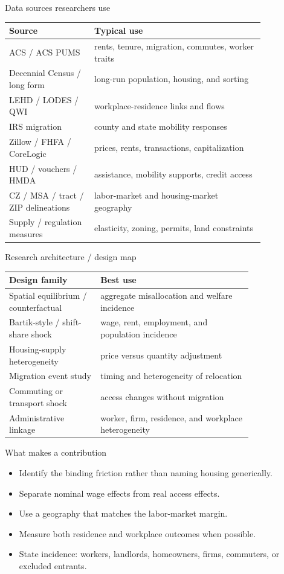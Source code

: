 \documentclass[aspectratio=169,11pt]{beamer}
\begin{document}
\begin{frame}{Data sources researchers use}
\small
\begin{tabular}{p{0.28\linewidth} p{0.56\linewidth}}
\toprule
Source & Typical use \\
\midrule
ACS / ACS PUMS & rents, tenure, migration, commutes, worker traits \\
Decennial Census / long form & long-run population, housing, and sorting \\
LEHD / LODES / QWI & workplace-residence links and flows \\
IRS migration & county and state mobility responses \\
Zillow / FHFA / CoreLogic & prices, rents, transactions, capitalization \\
HUD / vouchers / HMDA & assistance, mobility supports, credit access \\
CZ / MSA / tract / ZIP delineations & labor-market and housing-market geography \\
Supply / regulation measures & elasticity, zoning, permits, land constraints \\
\bottomrule
\end{tabular}
\end{frame}

\begin{frame}{Research architecture / design map}
\small
\begin{tabular}{p{0.30\linewidth} p{0.50\linewidth}}
\toprule
Design family & Best use \\
\midrule
Spatial equilibrium / counterfactual & aggregate misallocation and welfare incidence \\
Bartik-style / shift-share shock & wage, rent, employment, and population incidence \\
Housing-supply heterogeneity & price versus quantity adjustment \\
Migration event study & timing and heterogeneity of relocation \\
Commuting or transport shock & access changes without migration \\
Administrative linkage & worker, firm, residence, and workplace heterogeneity \\
\bottomrule
\end{tabular}
\end{frame}

\begin{frame}{What makes a contribution}
\begin{itemize}
    \item Identify the binding friction rather than naming housing generically.
    \item Separate nominal wage effects from real access effects.
    \item Use a geography that matches the labor-market margin.
    \item Measure both residence and workplace outcomes when possible.
    \item State incidence: workers, landlords, homeowners, firms, commuters, or excluded entrants.
\end{itemize}
\end{frame}
\end{document}
